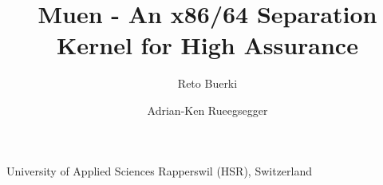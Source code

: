 \documentclass[a4paper,twoside]{book}
\title{Muen - An x86/64 Separation Kernel for High Assurance}
\author{Reto Buerki \and Adrian-Ken Rueegsegger}
\begin{document}


\frontmatter
\maketitle

\begin{center}
	University of Applied Sciences Rapperswil (HSR), Switzerland
\end{center}




\tableofcontents
\listoffigures
\listoftables
\lstlistoflistings

\mainmatter







\backmatter
\cleardoublepage
{}
{}
\printindex



\end{document}
